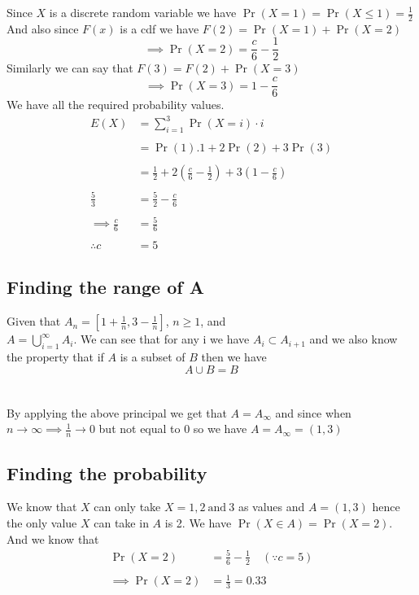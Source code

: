 \documentclass[journal,12pt,twocolumn]{IEEEtran}
\providecommand{\brak}[1]{\ensuremath{\left(#1\right)}}
\begin{document}
Since $X$ is a discrete random variable we have $\Pr\brak{X=1} = \Pr\brak{X\leq1} = \frac{1}{2}$\\And also since $F\brak{x}$ is a cdf we have $F\brak{2} = \Pr\brak{X=1}+\Pr\brak{X=2}$\\
$$\implies \Pr\brak{X=2} = \frac{c}{6}-\frac{1}{2}$$
Similarly we can say that $F\brak{3} = F\brak{2} + \Pr\brak{X=3}$
$$\implies \Pr\brak{X=3} = 1 - \frac{c}{6}$$
We have all the required probability values.
\begin{align}
 E\brak{X} &= \sum_{i=1}^{3}\Pr\brak{X=i}\cdot i\\
\nonumber \\
 &= \Pr\brak{1}.1 +2\Pr\brak{2} + 3\Pr\brak{3}\\
\nonumber \\
 &= \frac{1}{2}+ 2\brak{\frac{c}{6}-\frac{1}{2}}+3\brak{1-\frac{c}{6}}\\
\nonumber \\
\frac{5}{3} &= \frac{5}{2} - \frac{c}{6}\\
\nonumber \\
 \implies\frac{c}{6} &= \frac{5}{6}\\
\nonumber \\
 \therefore c &= 5
\end{align}


\subsection{Finding the range of A}
Given that $A_n = \left[1+\frac{1}{n},3-\frac{1}{n}\right]$, $n\geq1$, and \\$A = \bigcup_{i=1}^{\infty}A_i$. We can see  that for any i we have $A_i \subset A_{i+1}$ and we also know the property that if $A$ is a subset of $B$ then we have $$A\cup B = B$$\\\\
By applying the above principal we get that $A = A_\infty$ and since when $n \rightarrow \infty \implies \frac{1}{n} \rightarrow 0$ but not equal to 0 so we have $A = A_\infty = \brak{1,3}$

\subsection{Finding the probability }
 We know that $X$ can only take $X =1,2 \: \text{and}\: 3 $ as values and $A = \brak{1,3} $ hence the only value $X$ can take in $A$ is 2. We have $\Pr\brak{X\in A} = \Pr\brak{X = 2}$. And we know that  
\begin{align}
 \Pr\brak{X =2 } &= \frac{5}{6} - \frac{1}{2} \quad \brak{\because c =5}\\
\nonumber \\
 \implies \Pr\brak{X = 2} &= \frac{1}{3}=0.33
\end{align}
\end{document}
